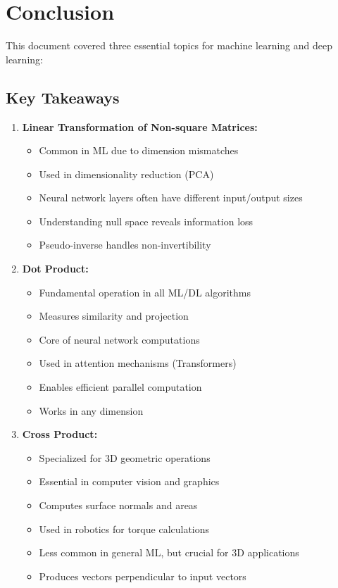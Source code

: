 \documentclass[12pt,a4paper]{article}
\theoremstyle{definition}
\begin{document}
\section{Conclusion}

This document covered three essential topics for machine learning and deep learning:

\subsection{Key Takeaways}

\begin{enumerate}
    \item \textbf{Linear Transformation of Non-square Matrices:}
    \begin{itemize}
        \item Common in ML due to dimension mismatches
        \item Used in dimensionality reduction (PCA)
        \item Neural network layers often have different input/output sizes
        \item Understanding null space reveals information loss
        \item Pseudo-inverse handles non-invertibility
    \end{itemize}
    
    \item \textbf{Dot Product:}
    \begin{itemize}
        \item Fundamental operation in all ML/DL algorithms
        \item Measures similarity and projection
        \item Core of neural network computations
        \item Used in attention mechanisms (Transformers)
        \item Enables efficient parallel computation
        \item Works in any dimension
    \end{itemize}
    
    \item \textbf{Cross Product:}
    \begin{itemize}
        \item Specialized for 3D geometric operations
        \item Essential in computer vision and graphics
        \item Computes surface normals and areas
        \item Used in robotics for torque calculations
        \item Less common in general ML, but crucial for 3D applications
        \item Produces vectors perpendicular to input vectors
    \end{itemize}
\end{enumerate}
\end{document}
